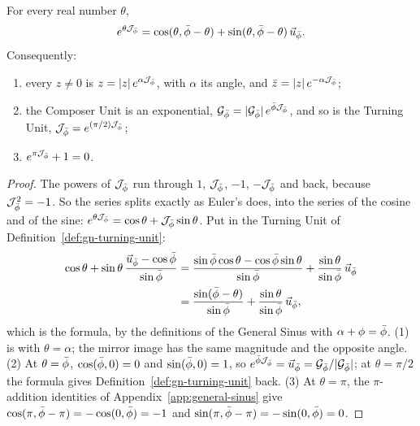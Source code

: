 \begin{theorem}\label{thm:gn-euler}
For every real number $\theta$,
\[
e^{\theta\mathcal{J}_{\bar{\phi}}} = \cos(\theta, \bar{\phi} - \theta) + \sin(\theta, \bar{\phi} - \theta)\,\vec{u}_{\bar{\phi}} .
\]
Consequently:
\begin{enumerate}
  \item every $z \neq 0$ is $z = |z|\,e^{\alpha\mathcal{J}_{\bar{\phi}}}$, with $\alpha$ its angle, and $\bar{z} = |z|\,e^{-\alpha\mathcal{J}_{\bar{\phi}}}$;
  \item the Composer Unit is an exponential, $\mathcal{G}_{\bar{\phi}} = |\mathcal{G}_{\bar{\phi}}|\,e^{\bar{\phi}\mathcal{J}_{\bar{\phi}}}$, and so is the Turning Unit, $\mathcal{J}_{\bar{\phi}} = e^{(\pi/2)\mathcal{J}_{\bar{\phi}}}$;
  \item $e^{\pi\mathcal{J}_{\bar{\phi}}} + 1 = 0$.
\end{enumerate}
\end{theorem}

\begin{proof}
The powers of $\mathcal{J}_{\bar{\phi}}$ run through $1$, $\mathcal{J}_{\bar{\phi}}$, $-1$, $-\mathcal{J}_{\bar{\phi}}$ and back, because $\mathcal{J}_{\bar{\phi}}^2 = -1$. So the series splits exactly as Euler's does, into the series of the cosine and of the sine: $e^{\theta\mathcal{J}_{\bar{\phi}}} = \cos\theta + \mathcal{J}_{\bar{\phi}}\sin\theta$. Put in the Turning Unit of Definition~\ref{def:gn-turning-unit}:
\begin{align*}
\cos\theta + \sin\theta\,\frac{\vec{u}_{\bar{\phi}} - \cos\bar{\phi}}{\sin\bar{\phi}}
&= \frac{\sin\bar{\phi}\cos\theta - \cos\bar{\phi}\sin\theta}{\sin\bar{\phi}} + \frac{\sin\theta}{\sin\bar{\phi}}\,\vec{u}_{\bar{\phi}} \\
&= \frac{\sin(\bar{\phi} - \theta)}{\sin\bar{\phi}} + \frac{\sin\theta}{\sin\bar{\phi}}\,\vec{u}_{\bar{\phi}} ,
\end{align*}
which is the formula, by the definitions of the General Sinus with $\alpha + \phi = \bar{\phi}$. (1) is  with $\theta = \alpha$; the mirror image has the same magnitude and the opposite angle. (2) At $\theta = \bar{\phi}$, $\cos(\bar{\phi}, 0) = 0$ and $\sin(\bar{\phi}, 0) = 1$, so $e^{\bar{\phi}\mathcal{J}_{\bar{\phi}}} = \vec{u}_{\bar{\phi}} = \mathcal{G}_{\bar{\phi}}/|\mathcal{G}_{\bar{\phi}}|$; at $\theta = \pi/2$ the formula gives Definition~\ref{def:gn-turning-unit} back. (3) At $\theta = \pi$, the $\pi$-addition identities of Appendix~\ref{app:general-sinus} give $\cos(\pi, \bar{\phi} - \pi) = -\cos(0, \bar{\phi}) = -1$ and $\sin(\pi, \bar{\phi} - \pi) = -\sin(0, \bar{\phi}) = 0$.
\end{proof}

